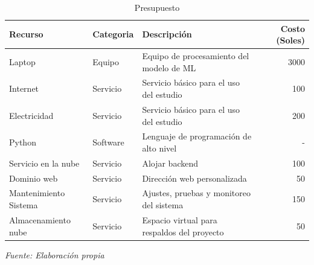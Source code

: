 		
		\begin{table}[h]
			\centering
			\caption{Presupuesto}
			\begin{tabular}{l|l|l|r}
				\textbf{Recurso} & \textbf{Categoria} & \textbf{Descripción} & \textbf{Costo (Soles)} \\ \hline
				Laptop & Equipo & Equipo de procesamiento del modelo de ML & 3000 \\
				Internet & Servicio & Servicio básico para el uso del estudio & 100\\
				Electricidad  & Servicio & Servicio básico para el uso del estudio  & 200\\
				Python & Software & Lenguaje de programación de alto nivel  & -\\
				Servicio en la nube & Servicio & Alojar backend & 100 \\
				Dominio web & Servicio & Dirección web personalizada & 50 \\
				Mantenimiento Sistema & Servicio & Ajustes, pruebas y monitoreo del sistema & 150 \\
				Almacenamiento nube & Servicio & Espacio virtual para respaldos del proyecto & 50 \\
				 \hline
			\end{tabular}
			\newline
			\newline
			\textit{Fuente: Elaboración propia}
			\label{tab:widgets}
		\end{table}